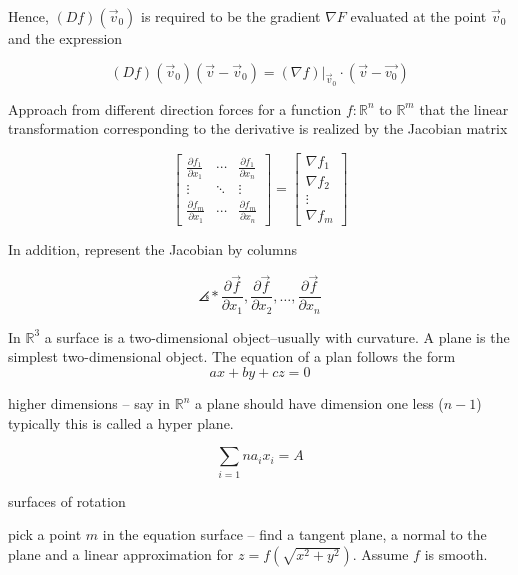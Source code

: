 \documentclass{scrreprt}
\begin{document}
Hence, $(Df)(\vec{v}_0)$ is required to be the gradient $\nabla F$ evaluated
at the point $\vec{v}_0$ and the expression

\[
	(Df)(\vec{v}_0)(\vec{v}-\vec{v}_0) = (\nabla f)\vert_{\vec{v}_0}\cdot (\vec{v}-\vec{v_0})
\]

Approach from different direction forces for a function $f:\mathbb{R}^n$ to
$\mathbb{R}^m$ that the linear transformation corresponding to the derivative
is realized by the Jacobian matrix

\[
	\begin{bmatrix}
		\frac{\partial f_1}{\partial x_1} & \cdots & \frac{\partial f_1}{\partial x_n} \\
		\vdots & \ddots & \vdots \\
		\frac{\partial f_m}{\partial x_1} & \cdots & \frac{\partial f_m}{\partial x_n}	
	\end{bmatrix} = 
	\begin{bmatrix}
		\nabla f_1 \\
		\nabla f_2 \\
		\vdots \\
		\nabla f_m
	\end{bmatrix}
\]

In addition, represent the Jacobian by columns

\[
	\angles*{\frac{\partial \vec{f}}{\partial x_1}, \frac{\partial \vec{f}}{\partial x_2}, \ldots, \frac{\partial \vec{f}}{\partial x_n}}
\]

\begin{example}
	In $\mathbb{R}^3$ a surface is a two-dimensional object--usually with curvature.
	A plane is the simplest two-dimensional object. The equation of a plan follows the form
	\[
		ax + by + cz = 0
	\]

	higher dimensions -- say in $\mathbb{R}^n$ a plane should have dimension one less ($n-1$)
	typically this is called a hyper plane.

	\[
		\sum_{i=1}{n}a_ix_i = A
	\]

	surfaces of rotation

	pick a point $m$ in the equation surface -- find a tangent plane, a normal to the plane
	and a linear approximation for $z=f(\sqrt{x^2 + y^2})$. Assume $f$ is smooth.
\end{example}
\end{document}
